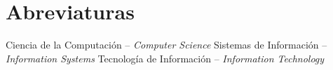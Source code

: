 \chapter*{Abreviaturas}

\begin{acronym}
 {Ciencia de la Computación -- {\it Computer Science}}
 {Sistemas de Información -- {\it Information Systems}}
 {Tecnología de Información -- {\it Information Technology}}

\end{acronym}
